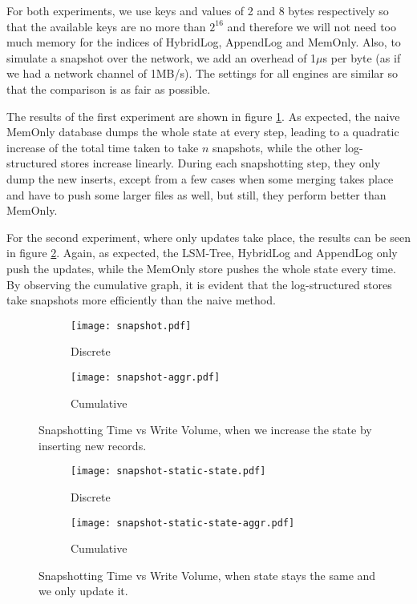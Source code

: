For both experiments, we use keys and values of 2 and 8 bytes respectively so that the available keys are no more than $2^{16}$ and therefore we will not need too much memory for the indices of HybridLog, AppendLog and MemOnly. Also, to simulate a snapshot over the network, we add an overhead of 1$\mu$s per byte (as if we had a network channel of 1MB/s). The settings for all engines are similar so that the comparison is as fair as possible.

The results of the first experiment are shown in figure \ref{fig:snapshot}. As expected, the naive MemOnly database dumps the whole state at every step, leading to a quadratic increase of the total time taken to take $n$ snapshots, while the other log-structured stores increase linearly. During each snapshotting step, they only dump the new inserts, except from a few cases when some merging takes place and have to push some larger files as well, but still, they perform better than MemOnly.

For the second experiment, where only updates take place, the results can be seen in figure \ref{fig:snapshot-static-state}. Again, as expected, the LSM-Tree, HybridLog and AppendLog only push the updates, while the MemOnly store pushes the whole state every time. By observing the cumulative graph, it is evident that the log-structured stores take snapshots more efficiently than the naive method.

\begin{figure}[h]
    \begin{subfigure}{.5\textwidth}
        \centering
        \texttt{[image: snapshot.pdf]}
        \caption{Discrete}
    \end{subfigure}
    \begin{subfigure}{.5\textwidth}
        \centering
        \texttt{[image: snapshot-aggr.pdf]}
        \caption{Cumulative}
    \end{subfigure}
    \caption{Snapshotting Time vs Write Volume, when we increase the state by inserting new records.}
    \label{fig:snapshot}
\end{figure}

\begin{figure}[h]
    \begin{subfigure}{.5\textwidth}
        \centering
        \texttt{[image: snapshot-static-state.pdf]}
        \caption{Discrete}
    \end{subfigure}
    \begin{subfigure}{.5\textwidth}
        \centering
        \texttt{[image: snapshot-static-state-aggr.pdf]}
        \caption{Cumulative}
    \end{subfigure}
    \caption{Snapshotting Time vs Write Volume, when state stays the same and we only update it.}
    \label{fig:snapshot-static-state}
\end{figure}

